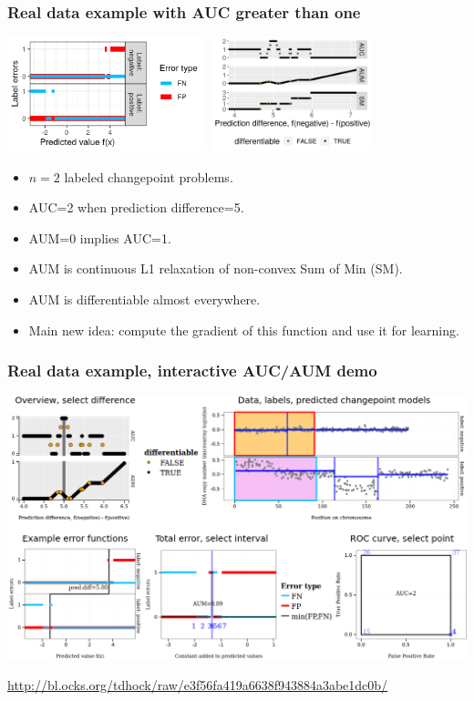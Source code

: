 \documentclass{beamer}
\begin{document}
\begin{frame}
  \frametitle{Real data example with AUC greater than one}

  \includegraphics[height=1.3in]{figure-aum-convexity-profiles}
  \includegraphics[height=1.3in]{figure-aum-convexity}

  \begin{itemize}
  \item $n=2$ labeled changepoint problems.
  \item AUC=2 when prediction difference=5.
  \item AUM=0 implies AUC=1. 
  \item AUM is continuous L1 relaxation of non-convex Sum of Min (SM).
  \item AUM is differentiable almost everywhere.
  \item Main new idea: compute the gradient of this function and use
    it for learning.
  \end{itemize}

\end{frame}

\begin{frame}
  \frametitle{Real data example, interactive AUC/AUM demo}

  \includegraphics[width=\textwidth]{figure-aum-convexity-interactive}

  \url{http://bl.ocks.org/tdhock/raw/e3f56fa419a6638f943884a3abe1dc0b/} 

\end{frame}
\end{document}
